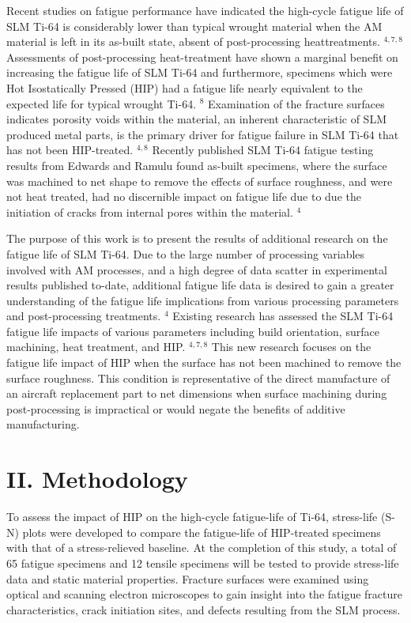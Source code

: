 \documentclass[10pt]{article}
\begin{document}
Recent studies on fatigue performance have indicated the high-cycle fatigue life of SLM Ti-64 is considerably lower than typical wrought material when the AM material is left in its as-built state, absent of post-processing heattreatments. ${ }^{4,7,8}$ Assessments of post-processing heat-treatment have shown a marginal benefit on increasing the fatigue life of SLM Ti-64 and furthermore, specimens which were Hot Isostatically Pressed (HIP) had a fatigue life nearly equivalent to the expected life for typical wrought Ti-64. ${ }^{8}$ Examination of the fracture surfaces indicates porosity voids within the material, an inherent characteristic of SLM produced metal parts, is the primary driver for fatigue failure in SLM Ti-64 that has not been HIP-treated. ${ }^{4,8}$ Recently published SLM Ti-64 fatigue testing results from Edwards and Ramulu found as-built specimens, where the surface was machined to net shape to remove the effects of surface roughness, and were not heat treated, had no discernible impact on fatigue life due to due the initiation of cracks from internal pores within the material. ${ }^{4}$

The purpose of this work is to present the results of additional research on the fatigue life of SLM Ti-64. Due to the large number of processing variables involved with AM processes, and a high degree of data scatter in experimental results published to-date, additional fatigue life data is desired to gain a greater understanding of the fatigue life implications from various processing parameters and post-processing treatments. ${ }^{4}$ Existing research has assessed the SLM Ti-64 fatigue life impacts of various parameters including build orientation, surface machining, heat treatment, and HIP. ${ }^{4,7,8}$ This new research focuses on the fatigue life impact of HIP when the surface has not been machined to remove the surface roughness. This condition is representative of the direct manufacture of an aircraft replacement part to net dimensions when surface machining during post-processing is impractical or would negate the benefits of additive manufacturing.

\section*{II. Methodology}
To assess the impact of HIP on the high-cycle fatigue-life of Ti-64, stress-life (S-N) plots were developed to compare the fatigue-life of HIP-treated specimens with that of a stress-relieved baseline. At the completion of this study, a total of 65 fatigue specimens and 12 tensile specimens will be tested to provide stress-life data and static material properties. Fracture surfaces were examined using optical and scanning electron microscopes to gain insight into the fatigue fracture characteristics, crack initiation sites, and defects resulting from the SLM process.
\end{document}
